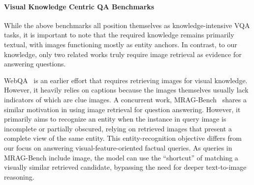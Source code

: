 \paragraph{Visual Knowledge Centric QA Benchmarks}
While the above benchmarks all position themselves as knowledge-intensive VQA tasks, it is important to note that the required knowledge remains primarily textual, with images functioning mostly as entity anchors. In contrast, to our knowledge, only two related works truly require image retrieval as evidence for answering questions.

WebQA~\citep{Chang_2022_CVPR} is an earlier effort that requires retrieving images for visual knowledge. However, it heavily relies on captions because the images themselves usually lack indicators of which are clue images. 
A concurrent work, MRAG-Bench~\citep{hu2024mragbenchvisioncentricevaluationretrievalaugmented} shares a similar motivation in using image retrieval for question answering. However, it primarily aims to recognize an entity when the instance in query image is incomplete or partially obscured, relying on retrieved images that present a complete view of the same entity. This entity-recognition objective differs from our focus on answering visual-feature-oriented factual queries. 
As queries in MRAG-Bench include image, the model can use the “shortcut” of matching a visually similar retrieved candidate, bypassing the need for deeper text-to-image reasoning.


